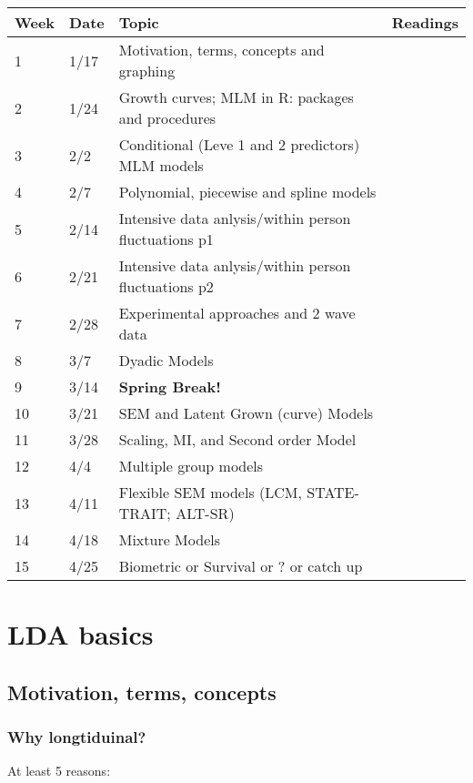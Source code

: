 \documentclass[]{book}
\begin{document}
\begin{longtable}[]{@{}llll@{}}
\toprule
Week & Date & Topic & Readings\tabularnewline
\midrule
\endhead
1 & 1/17 & Motivation, terms, concepts and graphing &\tabularnewline
2 & 1/24 & Growth curves; MLM in R: packages and procedures
&\tabularnewline
3 & 2/2 & Conditional (Leve 1 and 2 predictors) MLM models
&\tabularnewline
4 & 2/7 & Polynomial, piecewise and spline models &\tabularnewline
5 & 2/14 & Intensive data anlysis/within person fluctuations p1
&\tabularnewline
6 & 2/21 & Intensive data anlysis/within person fluctuations p2
&\tabularnewline
7 & 2/28 & Experimental approaches and 2 wave data &\tabularnewline
8 & 3/7 & Dyadic Models &\tabularnewline
9 & 3/14 & \textbf{Spring Break!} &\tabularnewline
10 & 3/21 & SEM and Latent Grown (curve) Models &\tabularnewline
11 & 3/28 & Scaling, MI, and Second order Model &\tabularnewline
12 & 4/4 & Multiple group models &\tabularnewline
13 & 4/11 & Flexible SEM models (LCM, STATE-TRAIT; ALT-SR)
&\tabularnewline
14 & 4/18 & Mixture Models &\tabularnewline
15 & 4/25 & Biometric or Survival or ? or catch up &\tabularnewline
\bottomrule
\end{longtable}

\chapter{LDA basics}\label{lda-basics}

\section{Motivation, terms, concepts}\label{motivation-terms-concepts}

\subsection{Why longtiduinal?}\label{why-longtiduinal}

At least 5 reasons:
\end{document}
